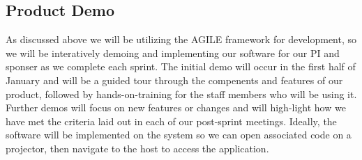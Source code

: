 \documentclass[10pt,twocolumn,letterpaper]{article}
\begin{document}
            \subsection{Product Demo}

            As discussed above we will be utilizing the AGILE framework for development, so we will be interatively demoing and implementing our software for our PI and sponser as we complete each sprint. The initial demo will occur in the first half of January and will be a guided tour through the compenents and features of our product, followed by hands-on-training for the staff members who will be using it. Further demos will focus on new features or changes and will high-light how we have met the criteria laid out in each of our post-sprint meetings. Ideally, the software will be implemented on the system so we can open associated code on a projector, then navigate to the host to access the application.
\end{document}
